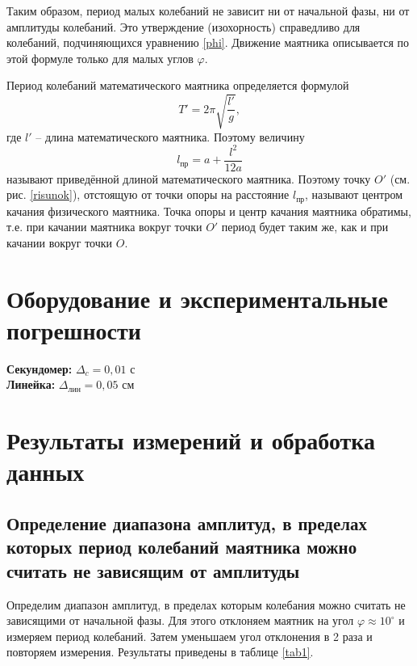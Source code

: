 \documentclass[a4paper,12pt]{article} %
\begin{document}
Таким образом, период малых колебаний не зависит ни от начальной фазы, ни от амплитуды колебаний. Это утверждение (изохорность) справедливо для колебаний, подчиняющихся уравнению \eqref{phi}. Движение маятника описывается по этой формуле только для малых углов $ \varphi $.

\medskip

Период колебаний математического маятника определяется формулой
\begin{equation}
T'=2\pi\sqrt{\frac{l'}{g}},
\end{equation}
где $ l' $ -- длина математического маятника. Поэтому величину
\begin{equation}\label{prived}
l_\text{пр}=a+\frac{l^2}{12a}
\end{equation}
называют приведённой длиной математического маятника. Поэтому точку $ O' $ (см. рис. \ref{risunok}), отстоящую от точки опоры на расстояние $ l_\text{пр} $, называют центром качания физического маятника. Точка опоры и центр качания маятника обратимы, т.е. при качании маятника вокруг  точки $ O' $ период будет таким же, как и при качании вокруг точки $ O $.

\section{Оборудование и экспериментальные погрешности}

\textbf{Секундомер:} $ \Delta_c = 0,01 \text{ с}$\\
\textbf{Линейка:} $ \Delta_\text{лин} = 0,05 \text{ см}$

\section{Результаты измерений и обработка данных}
\subsection{Определение диапазона амплитуд, в пределах которых период колебаний маятника можно считать не зависящим от амплитуды}\label{formuli}

Определим диапазон амплитуд, в пределах которым колебания можно считать не зависящими от начальной фазы. Для этого отклоняем маятник на угол $ \varphi \approx 10^\circ  $ и измеряем период колебаний. Затем уменьшаем угол отклонения в 2 раза и повторяем измерения. Результаты приведены в таблице \ref{tab1}.
\end{document}
